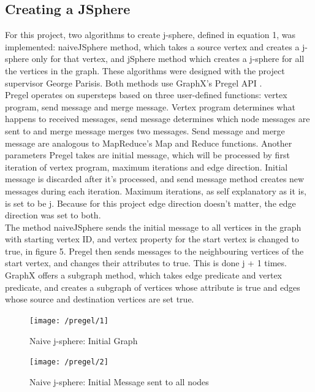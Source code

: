 \documentclass{article}
\theoremstyle{definition}
\begin{document}
\subsection{Creating a JSphere}

For this project, two algorithms to create j-sphere, defined in equation 1, was implemented: naiveJSphere method, which takes a source vertex and creates a j-sphere only for that vertex, and jSphere method which creates a j-sphere for all the vertices in the graph. These algorithms were designed with the project supervisor George Parisis. Both methods use GraphX's Pregel API \cite{GraphX}. \\

Pregel operates on supersteps based on three user-defined functions: vertex program, send message and merge message. Vertex program determines what happens to received messages, send message determines which node messages are sent to and merge message merges two messages. Send message and merge message are analogous to MapReduce's Map and Reduce functions. Another parameters Pregel takes are initial message, which will be processed by first iteration of vertex program, maximum iterations and edge direction. Initial message is discarded after it's processed, and send message method creates new messages during each iteration. Maximum iterations, as self explanatory as it is, is set to be j. Because for this project edge direction doesn't matter, the edge direction was set to both. \\

The method naiveJSphere sends the initial message to all vertices in the graph with starting vertex ID, and vertex property for the start vertex is changed to true, in figure 5. Pregel then sends messages to the neighbouring vertices of the start vertex, and changes their attributes to true. This is done j + 1 times. GraphX offers a subgraph method, which takes edge predicate and vertex predicate, and creates a subgraph of vertices whose attribute is true and edges whose source and destination vertices are set true. 

\begin{figure}[H]
\centering
\texttt{[image: /pregel/1]}
\caption{Naive j-sphere: Initial Graph}
\end{figure}

\begin{figure}[H]
\centering
\texttt{[image: /pregel/2]}
\caption{Naive j-sphere: Initial Message sent to all nodes}
\end{figure}
\end{document}
